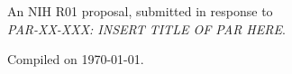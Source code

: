 \documentclass[11pt,notitlepage]{article}
\title{}
\author{
Name\\
Professor\\
Electrical and Computer Engineering\\
Baylor University\\
\vspace{.1in}\\
Collaborator Name \\
Title\\
Institution}
\begin{document}
\maketitle

\begin{center}
An NIH R01 proposal, submitted in response to \\
{\em PAR-XX-XXX: INSERT TITLE OF PAR HERE}.
\end{center}

\vfill

{\scriptsize Compiled on \today.}
\clearpage








\clearpage




\clearpage





\newpage




\newpage


\end{document}
